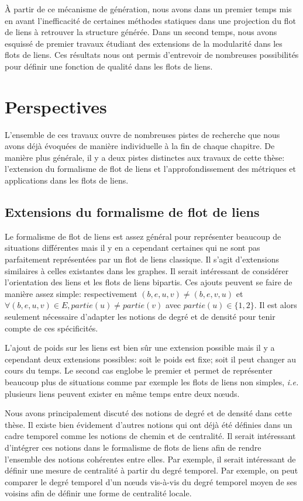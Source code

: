 \`A partir de ce mécanisme de génération, nous avons dans un premier temps mis en avant l'inefficacité de certaines méthodes statiques dans une projection du flot de liens à retrouver la structure générée.
Dans un second temps, nous avons esquissé de premier travaux étudiant des extensions de la modularité dans les flots de liens.
Ces résultats nous ont permis d'entrevoir de nombreuses possibilités pour définir une fonction de qualité dans les flots de liens.

\section{Perspectives}

L'ensemble de ces travaux ouvre de nombreuses pistes de recherche que nous avons déjà évoquées de manière individuelle à la fin de chaque chapitre.
De manière plus générale, il y a deux pistes distinctes aux travaux de cette thèse: l'extension du formalisme de flot de liens et l'approfondissement des métriques et applications dans les flots de liens.

\subsection{Extensions du formalisme de flot de liens}

Le formalisme de flot de liens est assez général pour représenter beaucoup de situations différentes mais il y en a cependant certaines qui ne sont pas parfaitement représentées par un flot de liens classique.
Il s'agit d'extensions similaires à celles existantes dans les graphes.
Il serait intéressant de considérer l'orientation des liens et les flots de liens bipartis.
Ces ajouts peuvent se faire de manière assez simple: respectivement $(b,e,u,v)\neq (b,e,v,u)$ et $\forall (b,e,u,v) \in E, partie(u)\neq partie(v)$ avec $partie(u) \in \{1,2\}$.
Il est alors seulement nécessaire d'adapter les notions de degré et de densité pour tenir compte de ces spécificités.

L'ajout de poids sur les liens est bien sûr une extension possible mais il y a cependant deux extensions possibles: soit le poids est fixe; soit il peut changer au cours du temps.
Le second cas englobe le premier et permet de représenter beaucoup plus de situations comme par exemple les flots de liens non simples, \emph{i.e.} plusieurs liens peuvent exister en même temps entre deux n\oe uds.

Nous avons principalement discuté des notions de degré et de densité dans cette thèse.
Il existe bien évidement d'autres notions qui ont déjà été définies dans un cadre temporel comme les notions de chemin et de centralité.
Il serait intéressant d'intégrer ces notions dans le formalisme de flots de liens afin de rendre l'ensemble des notions cohérentes entre elles.
Par exemple, il serait intéressant de définir une mesure de centralité à partir du degré temporel.
Par exemple, on peut comparer le degré temporel d'un n\oe uds vis-à-vis du degré temporel moyen de ses voisins afin de définir une forme de centralité locale.

